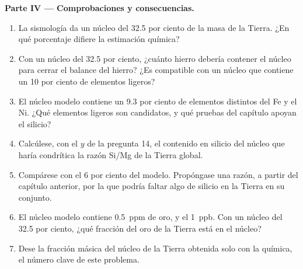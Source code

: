 \begin{problem}
\noindent\textbf{Parte IV --- Comprobaciones y consecuencias.}
\begin{enumerate}[resume]
\item La sismología da un núcleo del 32.5 por ciento de la masa de la Tierra. ¿En qué
porcentaje difiere la estimación química?
\item Con un núcleo del 32.5 por ciento, ¿cuánto hierro debería contener el núcleo para
cerrar el balance del hierro? ¿Es compatible con un núcleo que contiene un 10 por ciento de elementos
ligeros?
\item El núcleo modelo contiene un 9.3 por ciento de elementos distintos del Fe y el Ni. ¿Qué
elementos ligeros son candidatos, y qué pruebas del capítulo apoyan el silicio?
\item Calcúlese, con el $y$ de la pregunta 14, el contenido en silicio del núcleo que haría
condrítica la razón Si/Mg de la Tierra global.
\item Compárese con el 6 por ciento del modelo. Propóngase una razón, a partir del
capítulo anterior, por la que podría faltar algo de silicio en la Tierra en su conjunto.
\item El núcleo modelo contiene \qty{0.5}{ppm} de oro, y el 
\qty{1}{ppb}. Con un núcleo del 32.5 por ciento, ¿qué fracción del oro de la Tierra está
en el núcleo?
\item Dese la fracción másica del núcleo de la Tierra obtenida solo con la química,
el número clave de este problema.
\end{enumerate}
\end{problem}
